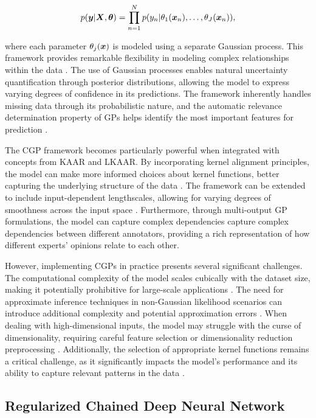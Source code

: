 \begin{align}
  p({\bm{y}}|{\bm{X}},\bm{\theta}) =
  \prod_{n=1}^{N}p(y_n|\theta_1({\bm{x}}_n),\dots , \theta_J({\bm{x}}_n)),
\end{align}

where each parameter $\theta_j({\bm{x}})$ is modeled using a separate
Gaussian process. This framework provides remarkable flexibility in
modeling complex relationships within the data \cite{GiraldoEtAl2022}.
The use of Gaussian processes enables natural uncertainty quantification through
posterior distributions, allowing the model to express varying
degrees of confidence in its predictions. The framework inherently
handles missing data through its probabilistic nature, and the
automatic relevance determination property of GPs helps identify the
most important features for prediction \cite{GiraldoEtAl2022}.

The \gls{CGP} framework becomes particularly powerful when integrated with
concepts from \gls{KAAR} and \gls{LKAAR}. By incorporating kernel alignment
principles, the model can make more informed choices about kernel
functions, better capturing the underlying structure of the data
\cite{GiraldoEtAl2022}. The framework can be extended to include
input-dependent lengthscales, allowing for varying degrees of smoothness
across the input space \cite{GiraldoEtAl2022}. Furthermore, through
multi-output \gls{GP} formulations, the model can capture complex dependencies
capture complex dependencies between different annotators, providing
a rich representation of how different experts' opinions relate to
each other.

However, implementing \glspl{CGP} in practice presents several significant
challenges. The computational complexity of the model scales
cubically with the dataset size, making it potentially prohibitive
for large-scale applications \cite{LiuEtAl2020}. The need for
approximate inference techniques in non-Gaussian likelihood scenarios
can introduce additional complexity and potential approximation
errors \cite{RasmussenEtAl2006Chapter3}.
When dealing with high-dimensional inputs, the model
may struggle with the curse of dimensionality, requiring careful
feature selection or dimensionality reduction preprocessing
\cite{RasmussenEtAl2006Chapter3}.
Additionally, the selection of appropriate kernel functions remains a
critical challenge, as it significantly impacts the model's
performance and its ability to capture relevant patterns in the data
\cite{RasmussenEtAl2006Chapter9}.

\subsection{Regularized Chained Deep Neural Network}

